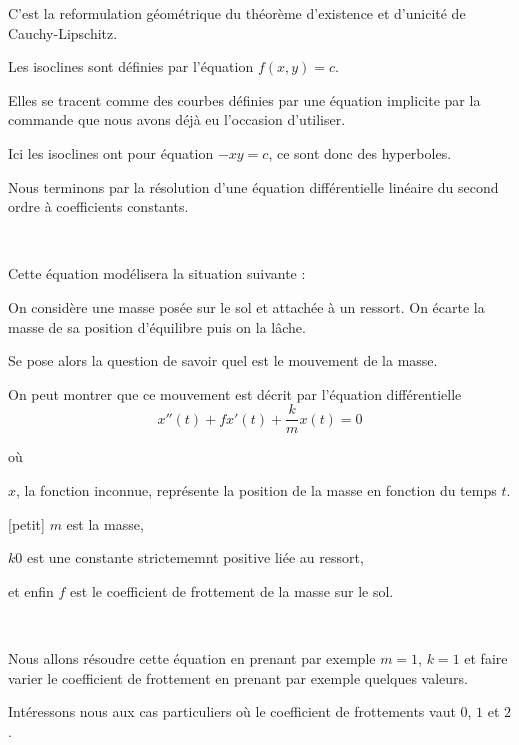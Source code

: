 C'est la reformulation géométrique du théorème d'existence et d'unicité de Cauchy-Lipschitz. 


\diapo    

 Les isoclines sont définies par l'équation $f(x,y) = c$.

\change
Elles se tracent comme des courbes définies par une équation implicite par la commande  que nous avons déjà eu l'occasion d'utiliser.
 
\change 
  Ici les isoclines ont pour équation $-xy=c$, ce sont donc des hyperboles.
  
  

\diapo

Nous terminons par la résolution d'une équation différentielle linéaire du second ordre
à coefficients constants.

~

Cette équation modélisera la situation suivante : 

On considère une masse posée sur le sol et attachée à un ressort. On écarte la masse de sa position d'équilibre puis on la lâche.

Se pose alors la question de savoir quel est le mouvement de la masse.


On peut montrer que ce mouvement est décrit par l'équation différentielle
$$x''(t) +f x'(t)+ \frac{k}{m} x(t) = 0$$ 

où 

$x$, la fonction inconnue, représente la position de la masse en fonction du temps $t$.

[petit] $m$ est la masse,

$k0$ est une constante strictememnt positive liée au ressort,

et enfin $f$ est le coefficient de frottement de la masse sur le sol.

~


Nous allons résoudre cette équation en prenant par exemple $m=1$, $k=1$ et faire varier le coefficient de frottement en prenant par exemple quelques valeurs.




\diapo

Intéressons nous aux cas particuliers où le coefficient de frottements vaut $0$, $1$ et $2$.

